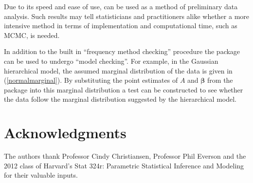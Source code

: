 \documentclass[article]{jss}
\begin{document}
Due to its speed and ease of use,  can be used as a method of preliminary data analysis. Such results may tell statisticians and practitioners alike whether a more intensive method in terms of implementation and computational time, such as MCMC, is needed. 


In addition to the built in ``frequency method checking'' procedure the package can be used to undergo ``model checking''. For example, in the Gaussian hierarchical model, the assumed marginal distribution of the data is given in (\ref{normalmarginal}). By substituting the point estimates of $A$ and $\boldsymbol{\beta}$ from the package into this marginal distribution a test can be constructed to see whether the data follow the marginal distribution suggested by the hierarchical model.


\section[acknowledgments]{Acknowledgments}
The authors thank Professor Cindy Christiansen, Professor Phil Everson and the 2012 class of Harvard's Stat 324r: Parametric Statistical Inference and Modeling for their valuable inputs.


\end{document}
